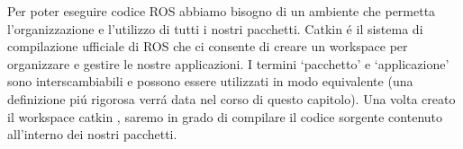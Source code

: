 Per poter eseguire codice ROS abbiamo bisogno di un ambiente che permetta l'organizzazione e l'utilizzo di tutti i nostri pacchetti.
Catkin \'{e} il sistema di compilazione ufficiale di ROS che ci consente di creare un workspace per organizzare 
e gestire le nostre applicazioni.
I termini `pacchetto' e `applicazione' sono interscambiabili e possono essere utilizzati in modo equivalente (una definizione pi\'{u} 
rigorosa verr\'{a} data nel corso di questo capitolo).
Una volta creato il workspace catkin \cite{catkin_ws}, saremo in grado di compilare il codice sorgente contenuto all'interno 
dei nostri pacchetti.
